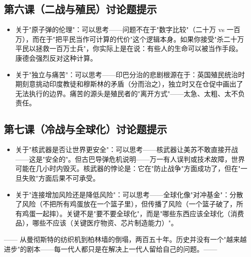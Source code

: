 \documentclass[a4paper,12pt]{ctexart}
\begin{document}
\subsection*{第六课（二战与殖民）讨论题提示}
\begin{itemize}
  \item 关于"原子弹的伦理"：可以思考——问题不在于"数字比较"（二十万 vs 一百万），而在于"把平民当作可计算的代价"这个逻辑本身。如果你接受"杀二十万平民以拯救一百万士兵"，你实际上是在说：有些人的生命可以被当作手段。康德会强烈反对这种计算。
  \item 关于"独立与痛苦"：可以思考——印巴分治的悲剧根源在于：英国殖民统治时期刻意挑动印度教徒和穆斯林的矛盾（分而治之），独立时又在仓促中画出了无法执行的边界。痛苦的源头是殖民者的"离开方式"——太急、太粗、太不负责任。
\end{itemize}

\subsection*{第七课（冷战与全球化）讨论题提示}
\begin{itemize}
  \item 关于"核武器是否让世界更安全"：可以思考——核武器让美苏不敢直接开战——这是"安全的"。但古巴导弹危机说明——万一有人误判或技术故障，世界可能在几小时内毁灭。核武器的悖论是：它在"防止战争"方面成功了，但在"一旦失败"方面后果不可承受。
  \item 关于"连接增加风险还是降低风险"：可以思考——全球化像"对冲基金"：分散了风险（不把所有鸡蛋放在一个篮子里），但传播了风险（一个篮子破了，所有鸡蛋一起摔）。关键不是"要不要全球化"，而是"哪些东西应该全球化（消费品），哪些不应该（关键医疗物资、芯片制造能力）"。
\end{itemize}

\vspace{0.5cm}
\begin{center}
\textcolor{blue!70!black}{\large —— 从曼彻斯特的纺织机到柏林墙的倒塌，两百五十年。历史并没有一个"越来越进步"的剧本——每一代人都只是在解决上一代人留给自己的问题。——}
\end{center}
\end{document}

